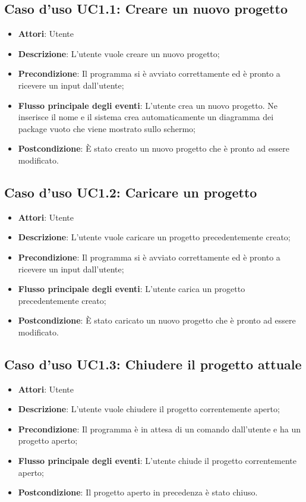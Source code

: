 \documentclass[../AnalisiDeiRequisiti.tex]{subfiles}
\begin{document}
	\subsection{Caso d'uso UC1.1: Creare un nuovo progetto}
	\begin{itemize}
		\item \textbf{Attori}: Utente
		\item \textbf{Descrizione}: L'utente vuole creare un nuovo progetto;
		\item \textbf{Precondizione}: Il programma si è avviato correttamente ed è pronto a ricevere un input dall'utente;
		\item \textbf{Flusso principale degli eventi}: L'utente crea un nuovo progetto. Ne inserisce il nome e il sistema crea automaticamente un diagramma dei package vuoto che viene mostrato sullo schermo;
		\item \textbf{Postcondizione}: È stato creato un nuovo progetto che è pronto ad essere modificato.
	\end{itemize}
	\subsection{Caso d'uso UC1.2: Caricare un progetto}
	\begin{itemize}
		\item \textbf{Attori}: Utente
		\item \textbf{Descrizione}: L'utente vuole caricare un progetto precedentemente creato;
		\item \textbf{Precondizione}: Il programma si è avviato correttamente ed è pronto a ricevere un input dall'utente;
		\item \textbf{Flusso principale degli eventi}: L'utente carica un progetto precedentemente creato;
		\item \textbf{Postcondizione}: È stato caricato un nuovo progetto che è pronto ad essere modificato.
	\end{itemize}
	\subsection{Caso d'uso UC1.3: Chiudere il progetto attuale}
	\begin{itemize}
		\item \textbf{Attori}: Utente
		\item \textbf{Descrizione}: L'utente vuole chiudere il progetto correntemente aperto;
		\item \textbf{Precondizione}: Il programma è in attesa di un comando dall'utente e ha un progetto aperto;
		\item \textbf{Flusso principale degli eventi}: L'utente chiude il progetto correntemente aperto;
		\item \textbf{Postcondizione}: Il progetto aperto in precedenza è stato chiuso.
	\end{itemize}
\end{document}
